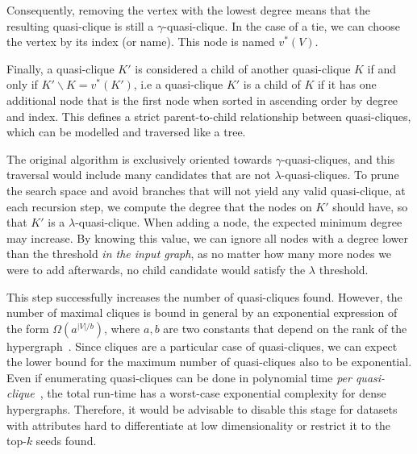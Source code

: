 Consequently, removing the vertex with the lowest degree means that the resulting
quasi-clique is still a $\gamma$-quasi-clique. In the case of a tie, we can choose
the vertex by its index (or name). This node is named $v^*(V)$.

Finally, a quasi-clique $K'$ is considered a child of another quasi-clique $K$
if and only if $K' \backslash K = {v^*(K')}$, i.e a quasi-clique $K'$ is a child
of $K$ if it has one additional
node that is the first node when sorted in ascending order by degree and index.
This defines a strict parent-to-child relationship between quasi-cliques,
which can be modelled and traversed like a tree.

The original algorithm \cite{uno_efficient_2010} is exclusively oriented towards
$\gamma$-quasi-cliques, and
this traversal would include many candidates that are not $\lambda$-quasi-cliques.
To prune the search space and avoid branches that will not yield any valid
quasi-clique, at each recursion step, we compute the degree that the nodes on
$K'$ should have, so that $K'$ is a $\lambda$-quasi-clique.
When adding a node, the expected minimum degree may increase.
By knowing this value, we can ignore all nodes with a degree lower than the threshold
\emph{in the input graph}, as no matter how many more nodes we were to add
afterwards, no child candidate would satisfy the $\lambda$ threshold.

This step successfully increases the number of quasi-cliques found.
However, the number of maximal cliques is bound in general by an exponential expression of the form
$\Omega(a^{|V|/b})$, where $a, b$ are two constants that depend on the rank of the hypergraph~\cite{Tomescu1981}.
Since cliques are a particular case of quasi-cliques, we can expect the lower bound for the
maximum number of quasi-cliques also to be exponential.
Even if enumerating quasi-cliques can be done in polynomial time
\emph{per quasi-clique}~\cite{uno_efficient_2010}, the total run-time has a worst-case exponential
complexity for dense hypergraphs. Therefore, it would be advisable to disable this stage for datasets
with attributes hard to differentiate at low dimensionality or restrict it to the top-$k$ 
seeds found.
\newpage


